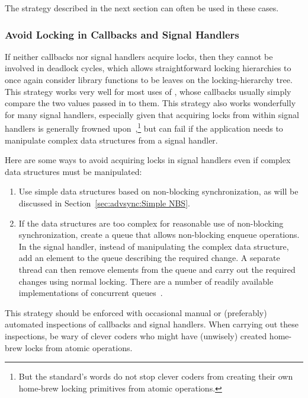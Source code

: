 The strategy described in the next section can often be used in these cases.

\subsubsection{Avoid Locking in Callbacks and Signal Handlers}
\label{sec:locking:Avoid Locking in Callbacks and Signal Handlers}

If neither callbacks nor signal handlers acquire locks, then they
cannot be involved in deadlock cycles, which allows straightforward
locking hierarchies to once again consider library functions to
be leaves on the locking-hierarchy tree.
This strategy works very well for most uses of , whose
callbacks usually simply compare the two values passed in to them.
This strategy also works wonderfully for many signal handlers,
especially given that acquiring locks from within signal handlers
is generally frowned upon~\cite{TheOpenGroup1997SUS},\footnote{
	But the standard's words do not stop clever coders from creating
	their own home-brew locking primitives from atomic operations.}
but can fail if the application needs to manipulate complex data structures
from a signal handler.

Here are some ways to avoid acquiring locks in signal handlers even
if complex data structures must be manipulated:

\begin{enumerate}
\item	Use simple data structures based on non-blocking synchronization,
	as will be discussed in
	Section~\ref{sec:advsync:Simple NBS}.
\item	If the data structures are too complex for reasonable use of
	non-blocking synchronization, create a queue that allows
	non-blocking enqueue operations.
	In the signal handler, instead of manipulating the complex
	data structure, add an element to the queue describing the
	required change.
	A separate thread can then remove elements from the queue and
	carry out the required changes using normal locking.
	There are a number of readily available implementations of
	concurrent
	queues~\cite{ChristophMKirsch2012FIFOisntTR,MathieuDesnoyers2009URCU,MichaelScott96}.
\end{enumerate}

This strategy should be enforced with occasional manual or (preferably)
automated inspections of callbacks and signal handlers.
When carrying out these inspections, be wary of clever coders who
might have (unwisely) created home-brew locks from atomic operations.

